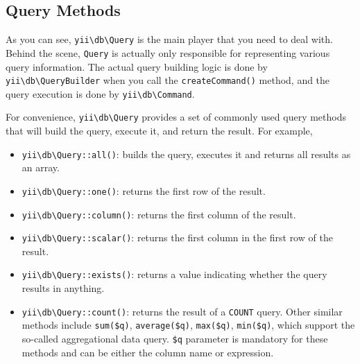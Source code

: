 \subsection{Query Methods}
As you can see, \texttt{yii{\allowbreak{}\textbackslash}db{\allowbreak{}\textbackslash}Query} is the main player that you need to deal with. Behind the scene,
\lstinline|Query| is actually only responsible for representing various query information. The actual query
building logic is done by \texttt{yii{\allowbreak{}\textbackslash}db{\allowbreak{}\textbackslash}QueryBuilder} when you call the \lstinline|createCommand()| method,
and the query execution is done by \texttt{yii{\allowbreak{}\textbackslash}db{\allowbreak{}\textbackslash}Command}.

For convenience, \texttt{yii{\allowbreak{}\textbackslash}db{\allowbreak{}\textbackslash}Query} provides a set of commonly used query methods that will build
the query, execute it, and return the result. For example,

\begin{itemize}
\item \texttt{yii{\allowbreak{}\textbackslash}db{\allowbreak{}\textbackslash}Query\allowbreak{}::\allowbreak{}all()}: builds the query, executes it and returns all results as an array.
\item \texttt{yii{\allowbreak{}\textbackslash}db{\allowbreak{}\textbackslash}Query\allowbreak{}::\allowbreak{}one()}: returns the first row of the result.
\item \texttt{yii{\allowbreak{}\textbackslash}db{\allowbreak{}\textbackslash}Query\allowbreak{}::\allowbreak{}column()}: returns the first column of the result.
\item \texttt{yii{\allowbreak{}\textbackslash}db{\allowbreak{}\textbackslash}Query\allowbreak{}::\allowbreak{}scalar()}: returns the first column in the first row of the result.
\item \texttt{yii{\allowbreak{}\textbackslash}db{\allowbreak{}\textbackslash}Query\allowbreak{}::\allowbreak{}exists()}: returns a value indicating whether the query results in anything.
\item \texttt{yii{\allowbreak{}\textbackslash}db{\allowbreak{}\textbackslash}Query\allowbreak{}::\allowbreak{}count()}: returns the result of a \lstinline|COUNT| query. Other similar methods
include \lstinline|sum($q)|, \lstinline|average($q)|, \lstinline|max($q)|, \lstinline|min($q)|, which support the so-called aggregational data query. \lstinline|$q|
parameter is mandatory for these methods and can be either the column name or expression.
\end{itemize}
